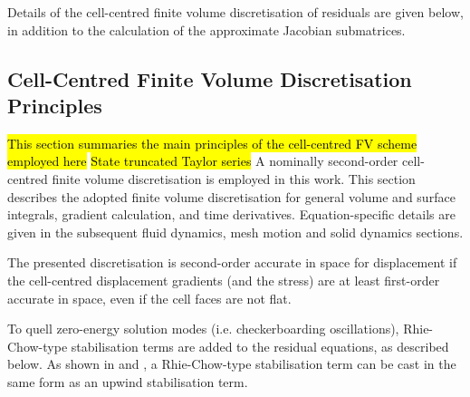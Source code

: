 \documentclass[sn-mathphys,Numbered]{sn-jnl}%
\newcommand{\bb}{\boldsymbol}
\begin{document}
Details of the cell-centred finite volume discretisation of residuals are given below, in addition to the calculation of the approximate Jacobian submatrices.




\subsection{Cell-Centred Finite Volume Discretisation Principles}
\hl{This section summaries the main principles of the cell-centred FV scheme employed here}
\hl{State truncated Taylor series}
A nominally second-order cell-centred finite volume discretisation is employed in this work.
This section describes the adopted finite volume discretisation for general volume and surface integrals, gradient calculation, and time derivatives.
Equation-specific details are given in the subsequent fluid dynamics, mesh motion and solid dynamics sections.

The presented discretisation is second-order accurate in space for displacement if the cell-centred displacement gradients (and the stress) are at least first-order accurate in space, even if the cell faces are not flat.

To quell zero-energy solution modes (i.e. checkerboarding oscillations), Rhie-Chow-type stabilisation terms \cite{Rhie1983} are added to the residual equations, as described below.
As shown in \citet{Cardiff2025jfnk} and \citet{Cardiff2020}, a Rhie-Chow-type stabilisation term can be cast in the same form as an upwind stabilisation term.

\end{document}
